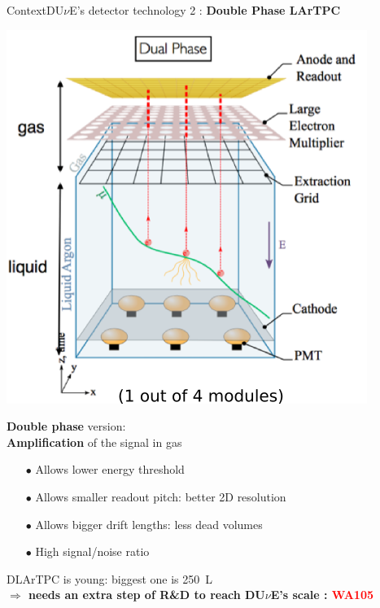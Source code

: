 \documentclass[10pt]{beamer}
\begin{document}
    \begin{frame}{Context}{DU$\nu$E's detector technology 2 : \textbf{Double Phase LArTPC}}
    	\begin{scriptsize}
    		\begin{minipage}{0.48\textwidth}
    			\includegraphics[width=\textwidth]{figures/contexte/dlartpc.png}\\
    		\end{minipage}
    		\hfill
    		\begin{minipage}{0.48\textwidth}
    			\textbf{Double phase} version: \\\textbf{Amplification} of the signal in gas
    			\begin{itemize}
    				\item[$\bullet$] Allows lower energy threshold
    				\item[$\bullet$] Allows smaller readout pitch: better 2D resolution
    				\item[$\bullet$] Allows bigger drift lengths: less dead volumes
    				\item[$\bullet$] High signal/noise ratio
    			\end{itemize}    			
    		\end{minipage}
    	\end{scriptsize}
    	\centering
    	DLArTPC is young: biggest one is \SI{250}{\liter}\\
    	\textbf{$\Rightarrow$ needs an extra step of R\&D to reach DU$\nu$E's scale : \textcolor{red}{WA105}}
    \end{frame}
    
\end{document}

